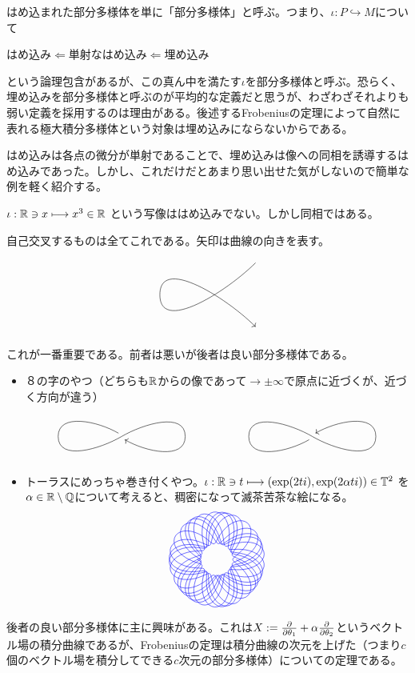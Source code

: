 \begin{rem}[部分多様体]
    はめ込まれた部分多様体を単に「部分多様体」と呼ぶ。つまり、$\iota:P\hookrightarrow M$について
    \begin{center}
        はめ込み$\Leftarrow$単射なはめ込み$\Leftarrow$埋め込み
    \end{center}
    という論理包含があるが、この真ん中を満たす$\iota$を部分多様体と呼ぶ。恐らく、埋め込みを部分多様体と呼ぶのが平均的な定義だと思うが、わざわざそれよりも弱い定義を採用するのは理由がある。後述するFrobeniusの定理によって自然に表れる極大積分多様体という対象は埋め込みにならないからである。
\end{rem}
はめ込みは各点の微分が単射であることで、埋め込みは像への同相を誘導するはめ込みであった。しかし、これだけだとあまり思い出せた気がしないので簡単な例を軽く紹介する。
\begin{eg}
    $\iota:\mathbb{R}\ni x\longmapsto x^3\in\mathbb{R}$ という写像ははめ込みでない。しかし同相ではある。
\end{eg}
\begin{eg}
    自己交叉するものは全てこれである。矢印は曲線の向きを表す。
    \[\begin{tikzpicture}
        \draw (1,1) to [out=-135,in=-90] (-2,0);
        \draw[->] (-2,0) to [out=90,in=135] (1,-1);
    \end{tikzpicture}\]
\end{eg}
\begin{eg}
これが一番重要である。前者は悪いが後者は良い部分多様体である。
    \begin{itemize}
        \item ８の字のやつ（どちらも$\mathbb{R}$からの像であって$\to\pm\infty$で原点に近づくが、近づく方向が違う）
        \[\begin{tikzpicture}
            \draw (-3-0.1,0.1) to [out=150,in=90] (-3-2,0);
            \draw (-3-2,0) to [out=-90,in=-150] (-3,0);
            \draw (-3,0) to [out=30,in=90] (-3+2,0);
            \draw[->] (-3+2,0) to [out=-90,in=-30] (-3+0.1,-0.1);
            
            \draw (3-0.1,-0.1) to [out=-150,in=-90] (3-2,0);
            \draw (3-2,0) to [out=90,in=150] (3,0);
            \draw (3,0) to [out=-30,in=-90] (3+2,0);
            \draw[->] (3+2,0) to [out=90,in=30] (3+0.1,0.1);
        \end{tikzpicture}\]
        \item トーラスにめっちゃ巻き付くやつ。$\iota:\mathbb{R}\ni t\longmapsto(\exp(2ti),\exp(2\alpha ti))\in \mathbb{T}^2$ を$\alpha\in\mathbb{R}\setminus\mathbb{Q}$について考えると、稠密になって滅茶苦茶な絵になる。
        \[\begin{tikzpicture}
            \draw[blue,samples=1000,domain=-9*pi:10*pi,variable=\theta] plot(\theta r:{0.5+sin(1.79*\theta r)^2});
            
        \end{tikzpicture}\]
    \end{itemize}
    後者の良い部分多様体に主に興味がある。これは$X:=\frac{\partial }{\partial \theta_1}+\alpha\frac{\partial }{\partial \theta_2}$というベクトル場の積分曲線であるが、Frobeniusの定理は積分曲線の次元を上げた（つまり$c$個のベクトル場を積分してできる$c$次元の部分多様体）についての定理である。
\end{eg}
